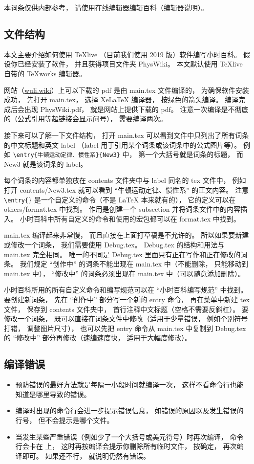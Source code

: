 
本词条仅供内部参考， 请使用\href{https://wuli.wiki/editor}{在线编辑器}编辑百科（编辑器说明）。

\subsection{文件结构}

本文主要介绍如何使用 TeXlive （目前我们使用 2019 版）软件编写小时百科。 假设你已经安装了软件， 并且获得项目文件夹 PhysWiki。 本文默认使用 TeXlive 自带的 TeXworks 编辑器。

网站（\href{https://wuli.wiki}{wuli.wiki}）上可以下载的 pdf 是由 main.tex 文件编译的， 为确保软件安装成功， 先打开 main.tex， 选择 XeLaTeX 编译器， 按绿色的箭头编译。 编译完成后会出现 PhysWiki.pdf， 就是网站上提供下载的 pdf。 注意一次编译是不彻底的（公式引用等超链接会显示问号）， 需要编译两次。

接下来可以了解一下文件结构， 打开 main.tex 可以看到文件中只列出了所有词条的中文标题和英文 label （label 用于引用某个词条或该词条中的公式图片等）。 例如 \verb|\entry{牛顿运动定律、惯性系}{New3}| 中， 第一个大括号就是词条的标题， 而 New3 就是该词条的 label。

每个词条的内容都单独放在 contents 文件夹中与 label 同名的 tex 文件中， 例如打开 contents/New3.tex 就可以看到 “牛顿运动定律、惯性系” 的正文内容。 注意 \verb|\entry{}| 是一个自定义的命令（不是 LaTeX 本来就有的）， 它的定义可以在 others/format.tex 中找到。 作用是创建一个 subsection 并将词条文件中的内容插入。 小时百科中所有自定义的命令和使用的宏包都可以在 format.tex 中找到。

main.tex 编译起来非常慢， 而且直接在上面打草稿是不允许的。 所以如果要新建或修改一个词条， 我们需要使用 Debug.tex。 Debug.tex 的结构和用法与 main.tex 完全相同。 唯一的不同是 Debug.tex 里面只有正在写作和正在修改的词条。 我们规定 “创作中” 的词条不能出现在 main.tex 中（不能删除， 只能移动到 main.tex 中）， “修改中” 的词条必须出现在 main.tex 中（可以随意添加删除）。

小时百科所用的所有自定义命令和编写规范可以在 “小时百科编写规范” 中找到。 要创建新词条， 先在 “创作中” 部分写一个新的 entry 命令， 再在菜单中新建 tex 文件， 保存到 contents 文件夹中， 首行注释中文标题（空格不需要反斜杠）。 要修改一个词条， 既可以直接在词条文件中修改（适用于少量错误， 例如个别符号打错， 调整图片尺寸）， 也可以先把 entry 命令从 main.tex 中复制到 Debug.tex 的 “修改中” 部分再修改（速编速度快， 适用于大幅度修改）。

\subsection{编译错误}

\begin{itemize}
\item 预防错误的最好方法就是每隔一小段时间就编译一次， 这样不看命令行也能知道是哪里导致的错误。
\item 编译时出现的命令行会进一步提示错误信息， 如错误的原因以及发生错误的行号， 但不会提示是哪个文件。
\item 当发生某些严重错误（例如少了一个大括号或美元符号）时再次编译， 命令行会卡在 \verb|| 上， 这时再按编译会提示你删除所有临时文件， 按确定， 再次编译即可。 如果还不行， 就说明仍然有错误。
\end{itemize}
